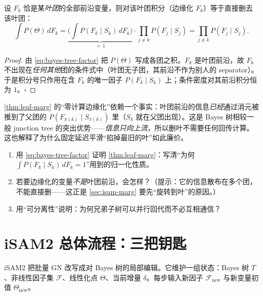 \begin{theorem}[叶剪枝 $=$ 精确边缘化]
\label{thm:leaf-marg}
设 $F_k$ 恰是某\emph{叶团}的全部前沿变量，则对该叶团积分（边缘化 $F_k$）等于直接删去该叶团：
\begin{equation}
  \int P(\Theta)\,dF_k
  =\underbrace{\Big(\int P(F_k\mid S_k)\,dF_k\Big)}_{=\,1}\cdot\prod_{j\neq k}P(F_j\mid S_j)
  =\prod_{j\neq k}P(F_j\mid S_j).
  \label{eq:leaf-marg}
\end{equation}
\end{theorem}
\begin{proof}
由 \cref{eq:bayes-tree-factor} 把 $P(\Theta)$ 写成各团之积。$F_k$ 是叶团前沿，故 $F_k$ 不出现在\emph{任何其他}团的条件式中（叶团无子团，其前沿不作为别人的 separator）。于是积分号只作用在含 $F_k$ 的唯一因子 $P(F_k\mid S_k)$ 上；条件密度对其前沿积分恒为 $1$。$\square$
\end{proof}

\begin{insight}
\cref{thm:leaf-marg} 的“零计算边缘化”依赖一个事实：叶团前沿的信息\emph{已经}通过消元被推到了父团的 $P(F_{\pi(k)}\mid S_{\pi(k)})$ 里（$S_k$ 就在父团出现）。这是 Bayes 树相较一般 junction tree 的突出优势——\emph{信息只向上流}，所以删叶不需要任何回传计算。这也解释了为什么固定延迟平滑“掐掉最旧的叶”如此廉价。
\end{insight}

\begin{practice}
\begin{enumerate}
  \item 用 \cref{eq:bayes-tree-factor} 证明 \cref{thm:leaf-marg}：写清“为何 $\int P(F_k\mid S_k)\,dF_k=1$”用到的归一化性质。
  \item 若要边缘化的变量\emph{不是}叶团前沿，会怎样？（提示：它的信息散布在多个团，不能直接删——这正是 \cref{sec:isam-marg} 要先“旋转到叶”的原因。）
  \item 用“可分离性”说明：为何兄弟子树可以并行回代而不必互相通信？
\end{enumerate}
\end{practice}

\section{iSAM2 总体流程：三把钥匙}
\label{sec:isam-algorithm}

iSAM2\cite{kaess2012isam2} 把批量 GN 改写成对 Bayes 树的局部编辑。它维护一组状态：Bayes 树 $T$、非线性因子集 $\mathcal{F}$、线性化点 $\Theta$、当前增量 $\delta$。每步输入新因子 $\mathcal{F}_{\text{new}}$ 与新变量初值 $\Theta_{\text{new}}$。

